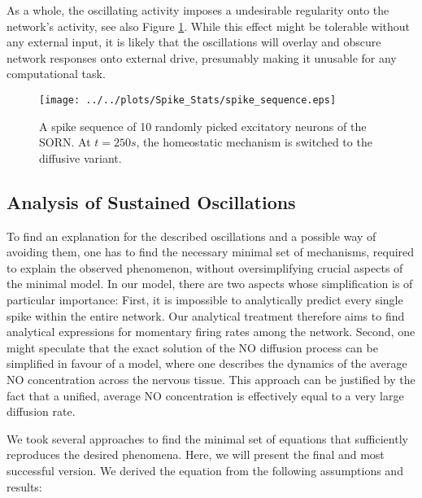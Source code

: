 \documentclass[10pt,a4paper]{article}
\begin{document}
As a whole, the oscillating activity imposes a undesirable regularity onto the network's activity, see also Figure \ref{spike_sequence}. While this effect might be tolerable without any external input, it is likely that the oscillations will overlay and obscure network responses onto external drive, presumably making it unusable for any computational task.
\begin{figure}
\texttt{[image: ../../plots/Spike\_Stats/spike\_sequence.eps]}
\caption{A spike sequence of 10 randomly picked excitatory neurons of the SORN. At $t=250s$, the homeostatic mechanism is switched to the diffusive variant.}
\label{spike_sequence}
\end{figure}

\subsection{Analysis of Sustained Oscillations}\label{theor_osc}

To find an explanation for the described oscillations and a possible way of avoiding them, one has to find the necessary minimal set of mechanisms, required to explain the observed phenomenon, without oversimplifying crucial aspects of the minimal model. In our model, there are two aspects whose simplification is of particular importance: First, it is impossible to analytically predict every single spike within the entire network. Our analytical treatment therefore aims to find analytical expressions for momentary firing rates among the network. Second, one might speculate that the exact solution of the NO diffusion process can be simplified in favour of a model, where one describes the dynamics of the average NO concentration across the nervous tissue. This approach can be justified by the fact that a unified, average NO concentration is effectively equal to a very large diffusion rate.

We took several approaches to find the minimal set of equations that sufficiently reproduces the desired phenomena. Here, we will present the final and most successful version. We derived the equation from the following assumptions and results:
\end{document}
